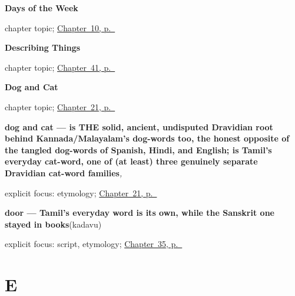 \noindent\begin{minipage}[t]{\linewidth}
\raggedright
\textbf{Days of the Week}\par
\footnotesize chapter topic; \hyperref[ch:ta-days-of-the-week]{Chapter~10, p.~\pageref*{ch:ta-days-of-the-week}}
\end{minipage}\par\smallskip

\noindent\begin{minipage}[t]{\linewidth}
\raggedright
\textbf{Describing Things}\par
\footnotesize chapter topic; \hyperref[ch:ta-describing-things]{Chapter~41, p.~\pageref*{ch:ta-describing-things}}
\end{minipage}\par\smallskip

\noindent\begin{minipage}[t]{\linewidth}
\raggedright
\textbf{Dog and Cat}\par
\footnotesize chapter topic; \hyperref[ch:ta-dog-and-cat]{Chapter~21, p.~\pageref*{ch:ta-dog-and-cat}}
\end{minipage}\par\smallskip

\noindent\begin{minipage}[t]{\linewidth}
\raggedright
\textbf{dog and cat —  is THE solid, ancient, undisputed Dravidian root behind Kannada/Malayalam's dog-words too, the honest opposite of the tangled dog-words of Spanish, Hindi, and English;  is Tamil's everyday cat-word, one of (at least) three genuinely separate Dravidian cat-word families}\enspace\emph{, }\par
\footnotesize explicit focus: etymology; \hyperref[ch:ta-dog-and-cat]{Chapter~21, p.~\pageref*{ch:ta-dog-and-cat}}
\end{minipage}\par\smallskip

\noindent\begin{minipage}[t]{\linewidth}
\raggedright
\textbf{door — Tamil's everyday word is its own, while the Sanskrit one stayed in books}\enspace\emph{}\enspace(kadavu)\par
\footnotesize explicit focus: script, etymology; \hyperref[ch:ta-arriving-at-a-house]{Chapter~35, p.~\pageref*{ch:ta-arriving-at-a-house}}
\end{minipage}\par\smallskip

\section*{E}

